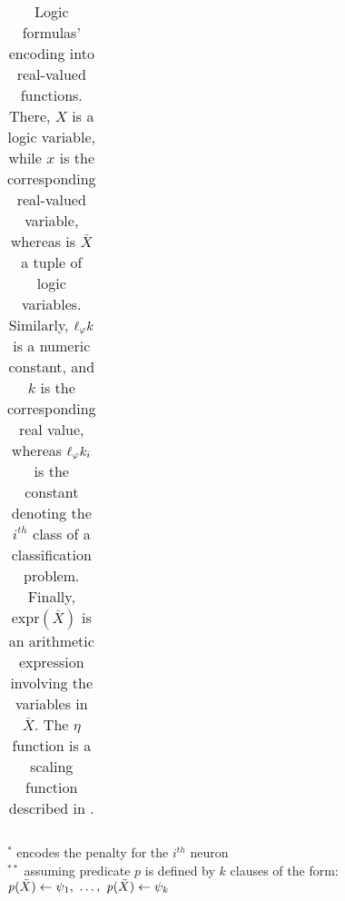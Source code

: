 \begin{table}
\begin{tabular}{l|r||cl|r}
    \end{tabular}
    \begin{center}\scriptsize
        $^{*}$ encodes the penalty for the $i^{th}$ neuron
        \\
        \smallskip
        $^{**}$ assuming predicate $p$ is defined by $k$ clauses of the form:
        \\
        $\pred{p}(\bar{X}) \leftarrow \psi_1,\ \ldots,\ \pred{p}(\bar{X}) \leftarrow \psi_k$
    \end{center}
    \caption[Logic formulas encoding for KILL fuzzifier]{
        Logic formulas' encoding into real-valued functions.
        There, $X$ is a logic variable, while $x$ is the corresponding real-valued variable, whereas is $\bar{X}$ a tuple of logic variables.
        Similarly, $\ell_{\varphi}{k}$ is a numeric constant, and $k$ is the corresponding real value, whereas $\ell_{\varphi}{k}_i$ is the constant denoting the $i^{th}$ class of a classification problem.
        Finally, $\text{expr}(\bar{X})$ is an arithmetic expression involving the variables in $\bar{X}$.
        The $\eta$ function is a scaling function described in .
    }
    \label{tab:kill-logic-formulae}
\end{table}